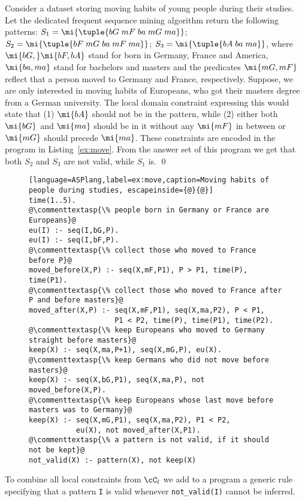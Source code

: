 \begin{example}
Consider a dataset storing moving habits of young people during their studies. Let the dedicated frequent sequence mining algorithm return the following patterns: $S_1=\mi{\tuple{bG\;mF\;ba\;mG\;ma}}$; $S_2=\mi{\tuple{bF\;mG\;ba\;mF\;ma}}$; $S_3=\mi{\tuple{bA\;ba\;ma}}$, where $\mi{bG,}\mi{bF,bA}$ stand for born in Germany, France and America, $\mi{ba,ma}$ stand for bachelors and masters and the predicates $\mi{mG,mF}$ reflect that a person moved to Germany and France, respectively. Suppose, we are only interested in moving habits of Europeans, who got their masters degree from a German university. The local domain constraint expressing this would state that (1) $\mi{bA}$ should not be in the pattern, while (2) either both $\mi{bG}$ and $\mi{ma}$ should be in it without any $\mi{mF}$ in between or $\mi{mG}$ should precede $\mi{ma}$. These constraints are encoded in the program in Listing~\ref{ex:move}. From the answer set of this program we get that both  $S_2$ and $S_3$ are not valid, while $S_1$ is. \qed

 \begin{figure}[t]
 \small{
 \begin{lstlisting}[language=ASPlang,label=ex:move,caption=Moving habits of people during studies, escapeinside={@}{@}]
time(1..5).
@\commenttextasp{\% people born in Germany or France are Europeans}@
eu(I) :- seq(I,bG,P).
eu(I) :- seq(I,bF,P).
@\commenttextasp{\% collect those who moved to France before P}@
moved_before(X,P) :- seq(X,mF,P1), P > P1, time(P), time(P1).
@\commenttextasp{\% collect those who moved to France after P and before masters}@
moved_after(X,P) :- seq(X,mF,P1), seq(X,ma,P2), P < P1, 
                    P1 < P2, time(P), time(P1), time(P2).
@\commenttextasp{\% keep Europeans who moved to Germany straight before masters}@
keep(X) :- seq(X,ma,P+1), seq(X,mG,P), eu(X).
@\commenttextasp{\% keep Germans who did not move before masters}@
keep(X) :- seq(X,bG,P1), seq(X,ma,P), not moved_before(X,P).
@\commenttextasp{\% keep Europeans whose last move before masters was to Germany}@
keep(X) :- seq(X,mG,P1), seq(X,ma,P2), P1 < P2,  
           eu(X), not moved_after(X,P1).
@\commenttextasp{\% a pattern is not valid, if it should not be kept}@
not_valid(X) :- pattern(X), not keep(X)
 \end{lstlisting}
}
 \end{figure}
\end{example}



\normalsize{
To combine all local constraints from $\cC_l$ we add to a program a generic rule specifying that a pattern \texttt{I} is valid whenever \texttt{not\_valid(I)} cannot be inferred. }

